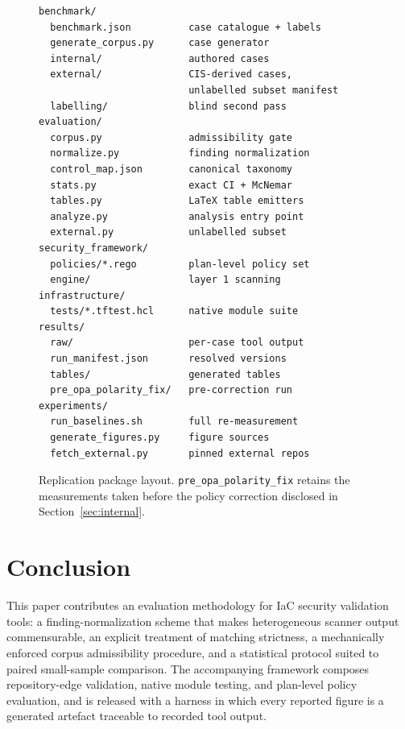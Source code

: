 \documentclass[smallextended]{svjour3}
\begin{document}
\begin{figure}[!t]
\centering
\footnotesize
\begin{verbatim}
benchmark/
  benchmark.json          case catalogue + labels
  generate_corpus.py      case generator
  internal/               authored cases
  external/               CIS-derived cases,
                          unlabelled subset manifest
  labelling/              blind second pass
evaluation/
  corpus.py               admissibility gate
  normalize.py            finding normalization
  control_map.json        canonical taxonomy
  stats.py                exact CI + McNemar
  tables.py               LaTeX table emitters
  analyze.py              analysis entry point
  external.py             unlabelled subset
security_framework/
  policies/*.rego         plan-level policy set
  engine/                 layer 1 scanning
infrastructure/
  tests/*.tftest.hcl      native module suite
results/
  raw/                    per-case tool output
  run_manifest.json       resolved versions
  tables/                 generated tables
  pre_opa_polarity_fix/   pre-correction run
experiments/
  run_baselines.sh        full re-measurement
  generate_figures.py     figure sources
  fetch_external.py       pinned external repos
\end{verbatim}
\caption{Replication package layout. \texttt{pre\_opa\_polarity\_fix} retains the
measurements taken before the policy correction disclosed in
Section~\ref{sec:internal}.}
\label{fig:artifact}
\end{figure}

\section{Conclusion}
\label{sec:conclusion}

This paper contributes an evaluation methodology for IaC security validation
tools: a finding-normalization scheme that makes heterogeneous scanner output
commensurable, an explicit treatment of matching strictness, a mechanically
enforced corpus admissibility procedure, and a statistical protocol suited to
paired small-sample comparison. The accompanying framework composes
repository-edge validation, native module testing, and plan-level policy
evaluation, and is released with a harness in which every reported figure is a
generated artefact traceable to recorded tool output.
\end{document}
